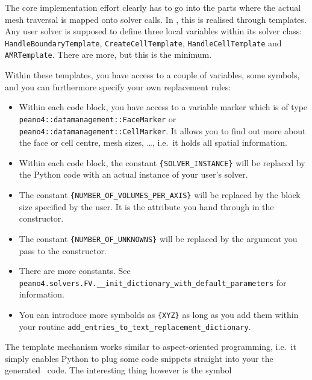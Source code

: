 The core implementation effort clearly has to go into the parts where the actual
mesh traversal is mapped onto solver calls.
In \ExaHyPE, this is realised through templates. 
Any user solver is supposed to define three local variables within its solver
class:
\texttt{HandleBoundaryTemplate}, 
\texttt{CreateCellTemplate}, \texttt{HandleCellTemplate} and
\texttt{AMRTemplate}.
There are more, but this is the minimum.


Within these templates, you have access to a couple of variables, some symbols,
and you can furthermore specify your own replacement rules:
\begin{itemize}
  \item Within each code block, you have access to a variable marker which is of
  type \texttt{peano4::datamanagement::FaceMarker} or
  \texttt{peano4::datamanagement::CellMarker}. It allows you to find out more
  about the face or cell centre, mesh sizes, \ldots, i.e.~it holds all spatial
  information.
  \item Within each code block, the constant \texttt{\{SOLVER\_INSTANCE\}} will
  be replaced by the Python code with an actual instance of your user's solver.
  \item The constant
  \texttt{\{NUMBER\_OF\_VOLUMES\_PER\_AXIS\}} will be replaced by the block size
  specified by the user. It is the attribute you hand through in the
  constructor.
  \item The constant
  \texttt{\{NUMBER\_OF\_UNKNOWNS\}} will be replaced by the argument you pass to
  the constructor.
  \item There are more constants. See \linebreak
  \texttt{peano4.solvers.FV.\_\_init\_dictionary\_with\_default\_parameters} for
  information.
  \item You can introduce more symbolds as \texttt{\{XYZ\}} as long as you add
  them within your routine
  \texttt{add\_entries\_to\_text\_replacement\_dictionary}.
\end{itemize}


\noindent
The template mechanism works similar to aspect-oriented programming, i.e.~it
simply enables Python to plug some code snippets straight into your the
generated \ExaHyPE\ code. 
The interesting thing however is the symbol

